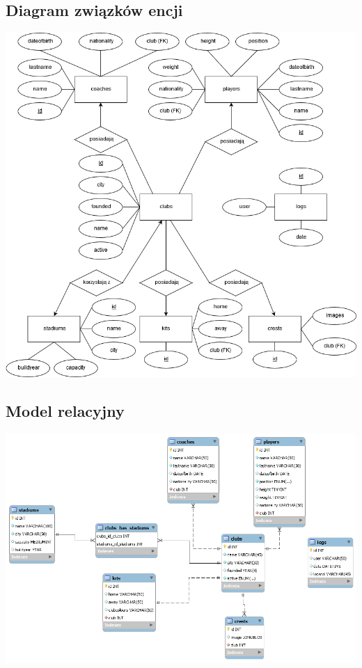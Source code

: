 \documentclass[12pt,a4paper]{article}
\begin{document}
    \subsection{Diagram związków encji}
        \begin{center}
            \includegraphics[scale=0.5]{diagram.png}
        \end{center}
    
    \subsection{Model relacyjny}
        \begin{center}
            \includegraphics[scale=0.5]{database-schema.png}
        \end{center}
    
\end{document}
